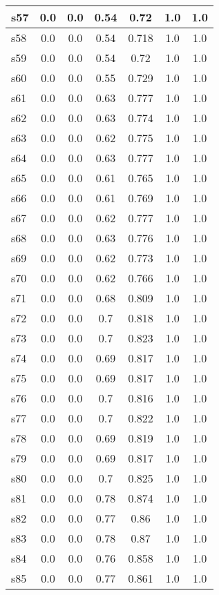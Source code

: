 \documentclass{article}
\begin{document}
\begin{tabular}{|l|c|c|c|c|c|c|}
\hline
s57 &0.0 & 0.0 & 0.54 & 0.72 & 1.0 & 1.0\\
\hline
s58 &0.0 & 0.0 & 0.54 & 0.718 & 1.0 & 1.0\\
\hline
s59 &0.0 & 0.0 & 0.54 & 0.72 & 1.0 & 1.0\\
\hline
s60 &0.0 & 0.0 & 0.55 & 0.729 & 1.0 & 1.0\\
\hline
s61 &0.0 & 0.0 & 0.63 & 0.777 & 1.0 & 1.0\\
\hline
s62 &0.0 & 0.0 & 0.63 & 0.774 & 1.0 & 1.0\\
\hline
s63 &0.0 & 0.0 & 0.62 & 0.775 & 1.0 & 1.0\\
\hline
s64 &0.0 & 0.0 & 0.63 & 0.777 & 1.0 & 1.0\\
\hline
s65 &0.0 & 0.0 & 0.61 & 0.765 & 1.0 & 1.0\\
\hline
s66 &0.0 & 0.0 & 0.61 & 0.769 & 1.0 & 1.0\\
\hline
s67 &0.0 & 0.0 & 0.62 & 0.777 & 1.0 & 1.0\\
\hline
s68 &0.0 & 0.0 & 0.63 & 0.776 & 1.0 & 1.0\\
\hline
s69 &0.0 & 0.0 & 0.62 & 0.773 & 1.0 & 1.0\\
\hline
s70 &0.0 & 0.0 & 0.62 & 0.766 & 1.0 & 1.0\\
\hline
s71 &0.0 & 0.0 & 0.68 & 0.809 & 1.0 & 1.0\\
\hline
s72 &0.0 & 0.0 & 0.7 & 0.818 & 1.0 & 1.0\\
\hline
s73 &0.0 & 0.0 & 0.7 & 0.823 & 1.0 & 1.0\\
\hline
s74 &0.0 & 0.0 & 0.69 & 0.817 & 1.0 & 1.0\\
\hline
s75 &0.0 & 0.0 & 0.69 & 0.817 & 1.0 & 1.0\\
\hline
s76 &0.0 & 0.0 & 0.7 & 0.816 & 1.0 & 1.0\\
\hline
s77 &0.0 & 0.0 & 0.7 & 0.822 & 1.0 & 1.0\\
\hline
s78 &0.0 & 0.0 & 0.69 & 0.819 & 1.0 & 1.0\\
\hline
s79 &0.0 & 0.0 & 0.69 & 0.817 & 1.0 & 1.0\\
\hline
s80 &0.0 & 0.0 & 0.7 & 0.825 & 1.0 & 1.0\\
\hline
s81 &0.0 & 0.0 & 0.78 & 0.874 & 1.0 & 1.0\\
\hline
s82 &0.0 & 0.0 & 0.77 & 0.86 & 1.0 & 1.0\\
\hline
s83 &0.0 & 0.0 & 0.78 & 0.87 & 1.0 & 1.0\\
\hline
s84 &0.0 & 0.0 & 0.76 & 0.858 & 1.0 & 1.0\\
\hline
s85 &0.0 & 0.0 & 0.77 & 0.861 & 1.0 & 1.0\\

\end{tabular}
\end{document}
